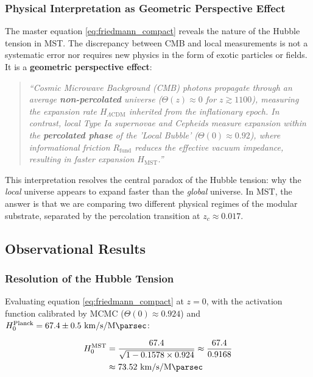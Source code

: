 \documentclass[11pt, a4paper]{article}
\theoremstyle{plain}
\theoremstyle{definition}
\newcommand{\Rfactor}{R_{\text{fund}}}
\begin{document}
\subsubsection{Physical Interpretation as Geometric Perspective Effect}
\label{subsec:perspective_effect}

The master equation \eqref{eq:friedmann_compact} reveals the nature of the Hubble tension in MST. The discrepancy between CMB and local measurements is not a systematic error nor requires new physics in the form of exotic particles or fields. It is a \textbf{geometric perspective effect}:

\begin{quote}
\emph{``Cosmic Microwave Background (CMB) photons propagate through an average \textbf{non-percolated} universe ($\Theta(z) \approx 0$ for $z \gtrsim 1100$), measuring the expansion rate $H_{\Lambda\text{CDM}}$ inherited from the inflationary epoch. In contrast, local Type Ia supernovae and Cepheids measure expansion within the \textbf{percolated phase} of the 'Local Bubble' ($\Theta(0) \approx 0.92$), where informational friction $\Rfactor$ reduces the effective vacuum impedance, resulting in faster expansion $H_{\text{MST}}$.''}
\end{quote}

This interpretation resolves the central paradox of the Hubble tension: why the \textit{local} universe appears to expand faster than the \textit{global} universe. In MST, the answer is that we are comparing two different physical regimes of the modular substrate, separated by the percolation transition at $z_c \approx 0.017$.

\subsection{Observational Results}

\subsubsection{Resolution of the Hubble Tension}

Evaluating equation \eqref{eq:friedmann_compact} at $z=0$, with the activation function calibrated by MCMC ($\Theta(0) \approx 0.924$) and $H_0^{\text{Planck}} = 67.4 \pm 0.5\ \si{\kilo\meter\per\second\per\mega\parsec}$:

\begin{align}
H_0^{\text{MST}} &= \frac{67.4}{\sqrt{1 - 0.1578 \times 0.924}} \approx \frac{67.4}{0.9168} \\
&\approx 73.52\ \si{\kilo\meter\per\second\per\mega\parsec}
\end{align}
\end{document}
